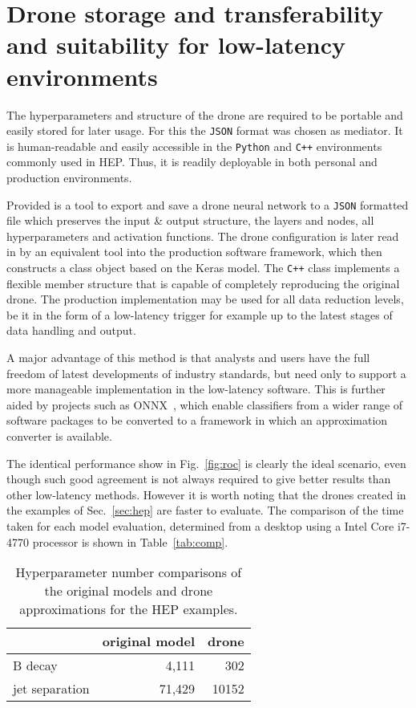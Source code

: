 \section{Drone storage and transferability and suitability
for low-latency environments}
\label{sec:storage}

The hyperparameters and structure of the drone are required to be
portable and easily stored for later usage. For this the {\tt JSON} format was chosen as
mediator. It is human-readable and easily accessible in the {\tt Python} and {\tt C++}
environments commonly used in HEP. Thus, it is readily deployable in both personal and production environments.

Provided is a tool to export and save a drone neural network to a {\tt JSON}
formatted file which preserves the input \& output structure,
the layers and nodes, all hyperparameters and activation functions.
The drone configuration is later read in by an equivalent tool into the production software framework,
which then constructs a class object based on the Keras model. The {\tt C++} class implements
a flexible member structure that is capable of completely reproducing the original drone. The production
implementation may be used for all data reduction levels, be it in the form of a low-latency trigger
for example up to the latest stages of data handling and output.

A major advantage of this method is that analysts and users have the full freedom of latest developments
of industry standards, but need only to support a more manageable implementation in the low-latency
software. This is further aided by projects such as ONNX~\cite{ONNX}, which enable classifiers from a wider
range of software packages to be converted to a framework in which an approximation converter
is available.

The identical performance show in Fig.~\ref{fig:roc} is clearly the ideal scenario, even though
such good agreement is not always required to give better results than other low-latency methods.
However it is worth noting that the drones created in the examples of Sec.~\ref{sec:hep} are faster to
evaluate. The comparison of the time taken for each model evaluation, determined from a desktop
using a Intel Core i7-4770 processor is shown in Table~\ref{tab:comp}.
\begin{table}[t]
  \centering
  \caption{Hyperparameter number comparisons of the original models and drone
  approximations for the HEP examples. \label{tab:comp_param}}
  \begin{tabular}{l|rr}
                   & original model                  & drone \\
    \hline
    B decay        & 4,111 & 302 \\
    jet separation & 71,429 & 10152 \\
  \end{tabular}
\end{table}

